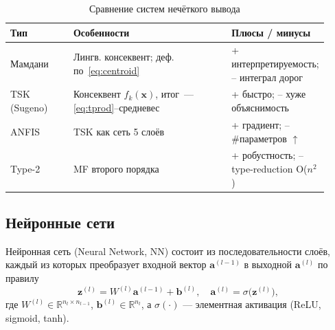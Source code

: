 \begin{table}[h]
\centering\small
\caption{Сравнение систем нечёткого вывода}
\label{tab:sys_comp}
\begin{tabular}{@{}p{0.21\linewidth}p{0.57\linewidth}p{0.14\linewidth}@{}}
\toprule
\textbf{Тип} & \textbf{Особенности} & \textbf{Плюсы / минусы} \\ \midrule
Мамдани & Лингв. консеквент; деф.\,по~\eqref{eq:centroid} &
          + интерпретируемость; – интеграл дорог \\[2pt]
TSK (Sugeno) & Консеквент $f_k(\mathbf x)$, итог~— \eqref{eq:tprod}–средневес & + быстро; – хуже объяснимость \\[2pt]
ANFIS & TSK как сеть 5 слоёв & + градиент; – \#параметров $\uparrow$ \\[2pt]
Type-2 & MF второго порядка & + робустность; – type-reduction O($n^2$) \\
\bottomrule
\end{tabular}
\end{table}


\subsection{Нейронные сети}
\label{subsec:neural_nets}

Нейронная сеть (Neural Network, NN) состоит из последовательности слоёв,
каждый из которых преобразует входной вектор $\mathbf{a}^{(l-1)}$ в
выходной $\mathbf{a}^{(l)}$ по правилу
\begin{equation}
  \mathbf{z}^{(l)} = W^{(l)}\mathbf{a}^{(l-1)} + \mathbf{b}^{(l)}, 
  \quad
  \mathbf{a}^{(l)} = \sigma\bigl(\mathbf{z}^{(l)}\bigr),
  \label{eq:nn_forward_full}
\end{equation}
где $W^{(l)}\in\mathbb{R}^{n_l\times n_{l-1}}$, 
$\mathbf{b}^{(l)}\in\mathbb{R}^{n_l}$,
а $\sigma(\cdot)$ — элементная активация (ReLU, sigmoid, tanh).

